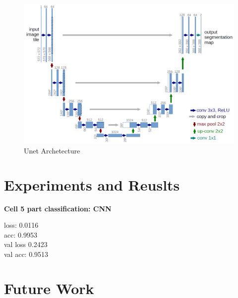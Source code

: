 \documentclass[ms,electronic,oneside,twosidetoc,letterpaper,chaptercenter,parttop]{byumsphd}
\begin{document}
\begin{figure}[H]
  \centering
  \includegraphics[width=.75\textwidth]{unet}
  \caption{Unet Archetecture}
\end{figure}

\chapter{Experiments and Reuslts}

\textbf{Cell 5 part classification: CNN}

loss: 0.0116 \\
acc: 0.9953 \\
val loss 0.2423 \\
val acc: 0.9513

\chapter{Future Work}



\end{document}
